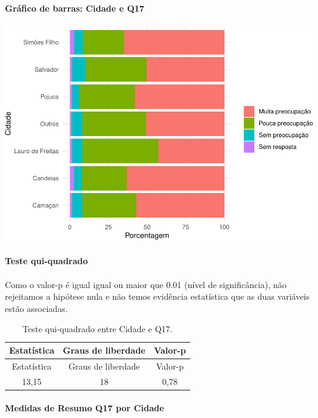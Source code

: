 \documentclass[]{article}
\let\oldparagraph\paragraph
\renewcommand{\paragraph}[1]{\oldparagraph{#1}\mbox{}}
\begin{document}
\hypertarget{gruxe1fico-de-barras-cidade-e-q17}{%
\paragraph{Gráfico de barras: Cidade e Q17}\label{gruxe1fico-de-barras-cidade-e-q17}}

\begin{center}\includegraphics[width=0.75\linewidth]{relatorio_covid19_files/figure-latex/unnamed-chunk-191-1} \end{center}

\hypertarget{teste-qui-quadrado-17}{%
\paragraph{Teste qui-quadrado}\label{teste-qui-quadrado-17}}

Como o valor-p é igual igual ou maior que 0.01 (nível de significância), não rejeitamos a hipótese nula e não temos evidência estatística que as duas variáveis estão associadas.

\begin{longtable}[]{@{}ccc@{}}
\caption{\label{tab:unnamed-chunk-193}Teste qui-quadrado entre Cidade e Q17.}\tabularnewline
\toprule
Estatística & Graus de liberdade & Valor-p\tabularnewline
\midrule
\endfirsthead
\toprule
Estatística & Graus de liberdade & Valor-p\tabularnewline
\midrule
\endhead
13,15 & 18 & 0,78\tabularnewline
\bottomrule
\end{longtable}

\cleardoublepage

\hypertarget{medidas-de-resumo-q17-por-cidade}{%
\paragraph{Medidas de Resumo Q17 por Cidade}\label{medidas-de-resumo-q17-por-cidade}}
\end{document}
